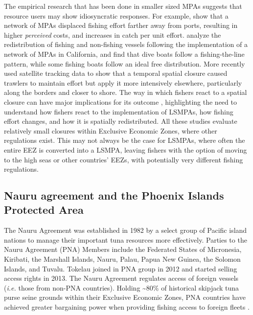 \documentclass[9pttwoside,lineno]{pnas-new}
\begin{document}
The empirical research that has been done in smaller sized MPAs
suggests that resource users may show idiosyncratic responses. For
example, \cite{stevenson_2013} show that a network of MPAs displaced
fishing effort farther away from ports, resulting in higher
\emph{perceived} costs, and increases in catch per unit effort.
\cite{cabral_2017} analyze the redistribution of fishing and
non-fishing vessels following the implementation of a network of MPAs in
California, and find that dive boats follow a
fishing-the-line pattern, while some fishing boats follow an ideal free
distribution. More recently \cite{elahi_2018} used satellite tracking
data to show that a temporal spatial closure caused trawlers to maintain
effort but apply it more intensively elsewhere, particularly along the
borders and closer to shore. The way in which fishers react to a spatial
closure can have major implications for its outcome
\citep{smith_2003,hilborn_2006}, highlighting the need to understand how
fishers react to the implementation of LSMPAs, how fishing effort
changes, and how it is spatially redistributed. All these studies evaluate relatively small closures within Exclusive Economic Zones, where other regulations exist.
This may not always be the case for LSMPAs, where often the entire EEZ
is converted into a LSMPA, leaving fishers with the option of moving to
the high seas or other countries' EEZs, with potentially very different fishing regulations.

\hypertarget{nauru-agreement-and-the-phoenix-island-protected-area}{%
\subsection{Nauru agreement and the Phoenix Islands Protected
Area}\label{nauru-agreement-and-the-phoenix-island-protected-area}}

The Nauru Agreement was established in 1982 by a select group of Pacific
island nations to manage their important tuna resources more effectively. Parties to the Nauru Agreement (PNA) Members
include the Federated States of Micronesia, Kiribati, the Marshall Islands,
Nauru, Palau, Papua New Guinea, the Solomon Islands, and Tuvalu. Tokelau joined in PNA group in 2012 and started selling access rights in 2013. The Nauru
Agreement regulates access of foreign vessels (\emph{i.e.} those from
non-PNA countries). Holding \textasciitilde{}80\% of historical
skipjack tuna purse seine grounds within their Exclusive Economic Zones, PNA
countries have achieved greater bargaining power when providing fishing access to foreign
fleets \cite{havice_2010}.
\end{document}
